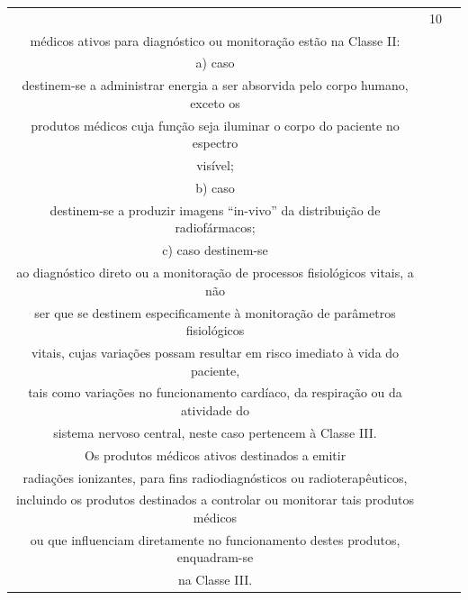 {{\begin{longtable}{|c|c|l|}
                                  & 10             & \begin{tabular}[c]{@{}l@{}}Os produtos\\ médicos ativos para diagnóstico ou monitoração estão na Classe II:\\ a) caso\\ destinem-se a administrar energia a ser absorvida pelo corpo humano, exceto os\\ produtos médicos cuja função seja iluminar o corpo do paciente no espectro\\ visível;\\ b) caso\\ destinem-se a produzir imagens “in-vivo” da distribuição de radiofármacos;\\ c) caso destinem-se\\ ao diagnóstico direto ou a monitoração de processos fisiológicos vitais, a não\\ ser que se destinem especificamente à monitoração de parâmetros fisiológicos\\ vitais, cujas variações possam resultar em risco imediato à vida do paciente,\\ tais como variações no funcionamento cardíaco, da respiração ou da atividade do\\ sistema nervoso central, neste caso pertencem à Classe III.\\ Os produtos médicos ativos destinados a emitir\\ radiações ionizantes, para fins radiodiagnósticos ou radioterapêuticos,\\ incluindo os produtos destinados a controlar ou monitorar tais produtos médicos\\ ou que influenciam diretamente no funcionamento destes produtos, enquadram-se\\ na Classe III.\end{tabular} \\ \cline{2-3} 

\end{longtable}}}
